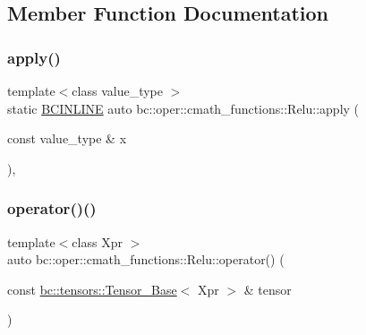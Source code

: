 \subsection{Member Function Documentation}
\mbox{\label{structbc_1_1oper_1_1cmath__functions_1_1Relu_aa44eaf05d55004b9808897ea0498c92b}} 
\subsubsection{\texorpdfstring{apply()}{apply()}}
{\footnotesize\ttfamily template$<$class value\+\_\+type $>$ \\
static \hyperlink{common_8h_a6699e8b0449da5c0fafb878e59c1d4b1}{B\+C\+I\+N\+L\+I\+NE} auto bc\+::oper\+::cmath\+\_\+functions\+::\+Relu\+::apply (\begin{DoxyParamCaption}\item[{const value\+\_\+type \&}]{x }\end{DoxyParamCaption})\hspace{0.3cm}{\ttfamily [inline]}, {\ttfamily [static]}}

\mbox{\label{structbc_1_1oper_1_1cmath__functions_1_1Relu_a17e9d7f907010478a6ff8b13d96ff922}} 
\subsubsection{\texorpdfstring{operator()()}{operator()()}\hspace{0.1cm}{\footnotesize\ttfamily [1/3]}}
{\footnotesize\ttfamily template$<$class Xpr $>$ \\
auto bc\+::oper\+::cmath\+\_\+functions\+::\+Relu\+::operator() (\begin{DoxyParamCaption}\item[{const \hyperlink{classbc_1_1tensors_1_1Tensor__Base}{bc\+::tensors\+::\+Tensor\+\_\+\+Base}$<$ Xpr $>$ \&}]{tensor }\end{DoxyParamCaption})\hspace{0.3cm}{\ttfamily [inline]}}

